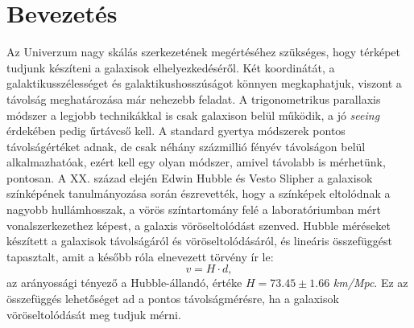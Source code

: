 \documentclass[12pt,letterpaper,oneside,openright]{book}
\begin{document}
\chapter{Bevezetés}
Az Univerzum nagy skálás szerkezetének megértéséhez szükséges, hogy térképet tudjunk készíteni a galaxisok elhelyezkedéséről. Két koordinátát, a galaktikusszélességet és galaktikushosszúságot könnyen megkaphatjuk, viszont a  távolság meghatározása már nehezebb feladat. A  trigonometrikus parallaxis módszer a legjobb technikákkal is csak galaxison belül működik, a jó \textit{seeing} érdekében pedig űrtávcső kell.  A standard gyertya módszerek pontos távolságértéket adnak, de csak néhány százmillió fényév távolságon belül alkalmazhatóak, ezért kell egy olyan módszer, amivel távolabb is mérhetünk, pontosan. 
\newline \indent
A XX. század elején Edwin Hubble és Vesto Slipher a galaxisok színképének tanulmányozása során észrevették, hogy a színképek eltolódnak a nagyobb hullámhosszak, a vörös színtartomány felé a laboratóriumban mért vonalszerkezethez képest, a galaxis vöröseltolódást szenved. Hubble méréseket készített a galaxisok távolságáról és vöröseltolódásáról, és lineáris összefüggést tapasztalt, amit a később róla elnevezett törvény ír le:
\begin{equation}
v = H\cdot d,
\end{equation}
az arányossági tényező a Hubble-állandó, értéke $ H = 73.45\pm1.66$ \textit{km/Mpc}. Ez az összefüggés lehetőséget ad  a pontos távolságmérésre, ha  a galaxisok vöröseltolódását meg tudjuk mérni. 
\newline \indent
\end{document}
